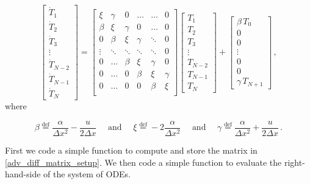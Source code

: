 \documentclass[11pt]{article}
\newcommand{\defn}{\stackrel{\text{def}}{=}}
\def\beq{\begin{equation}}
\def\eeq{\end{equation}}
\begin{document}
\beq
\label{adv_diff_matrix_setup}
\begin{bmatrix*}
\dot T_1    \\
\dot T_2 \\
\dot T_3 \\
\vdots \\
\dot T_{N-2} \\
\dot T_{N-1} \\
\dot T_{N} 
\end{bmatrix*}
=
\begin{bmatrix*}
    \xi & \gamma & 0 & \ldots & \ldots & 0\\
    \beta & \xi & \gamma & 0 & \ldots & 0\\
    0 & \beta & \xi & \gamma & \ddots & 0\\
    \vdots & \ddots & \ddots & \ddots & \ddots & 0\\
    0 & \ldots  & \beta & \xi & \gamma & 0\\    
    0 & \ldots & 0 & \beta & \xi & \gamma\\
    0 & \ldots & 0 & 0 & \beta & \xi \\    
\end{bmatrix*}
\begin{bmatrix*}
T_1    \\
T_2 \\
T_3 \\
\vdots \\
T_{N-2} \\
T_{N-1} \\
 T_{N} 
\end{bmatrix*}
 + 
\begin{bmatrix*}
\beta\, T_0    \\
0 \\
0 \\
\vdots \\
0 \\
0 \\
\gamma\, T_{N+1} 
\end{bmatrix*}\, ,
\eeq    
where 

\beq
\beta \defn \frac{\alpha}{\Delta x^2} - \frac{u}{2 \Delta x} \:\:\:\:\:\: \text{and}\:\: \:\:\:\: \xi \defn -2\frac{\alpha}{\Delta x^2}\:\: \:\:\:\: \text{and} \:\:\:\:\:\: \gamma \defn  \frac{\alpha}{\Delta x^2} + \frac{u}{2 \Delta x} \, .
\eeq

    First we code a simple function to compute and store the matrix in \eqref{adv_diff_matrix_setup}. We then code a simple function to evaluate the right-hand-side of the system of ODEs.
\end{document}
